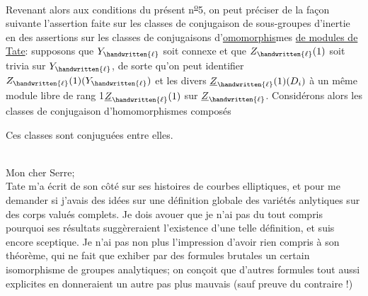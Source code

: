 Revenant alors aux conditions du présent n\textsuperscript{\uline{o}}5, on peut préciser de la façon suivante l'assertion faite sur les  classes de conjugaison de sous-groupes d'inertie en des assertions sur les classes de conjugaisons d'\uline{omomorphis}mes \uline{de modules de Tate}: supposons que $Y_{\handwritten{\ell}}$ soit connexe et que $Z_{\handwritten{\ell}}(1)$ soit trivia sur $Y_{\handwritten{\ell}}$,  de sorte qu'on peut identifier $Z_{\handwritten{\ell}}(1)(Y_{\handwritten{\ell}})$ et les divers $\underline{Z}_{\handwritten{\ell}}(1)(D_i)$ à un même module \handwritten{(}libre de rang 1\handwritten{)}$\underline{Z}_{\handwritten{\ell}}(1)$ sur $\underline{Z}_{\handwritten{\ell}}$. Considérons alors les classes de conjugaison d'homomorphismes composés

Ces classes sont conjuguées entre elles.


\\

Mon cher Serre;\\

Tate m'a écrit de son côté  sur ses histoires de courbes elliptiques, et pour me demander si j'avais des idées sur une définition globale des variétés anlytiques sur des corps valués complets. Je dois avouer que je n'ai pas du tout compris pourquoi ses résultats suggèreraient l'existence d'une telle définition, et suis encore sceptique. Je n'ai pas non plus l'impression d'avoir rien compris à son théorème, qui  ne fait que exhiber par des formules brutales un certain isomorphisme de groupes analytiques;  on conçoit que d'autres formules tout aussi explicites en donneraient un autre pas plus mauvais (sauf preuve du contraire !)

